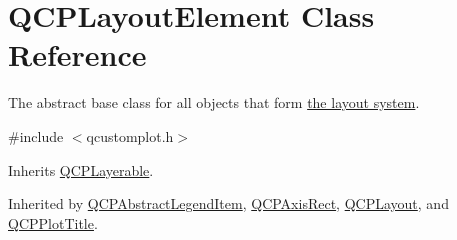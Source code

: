 \hypertarget{class_q_c_p_layout_element}{\section{Q\-C\-P\-Layout\-Element Class Reference}
\label{class_q_c_p_layout_element}
}


The abstract base class for all objects that form \hyperlink{thelayoutsystem}{the layout system}.  




{\ttfamily \#include $<$qcustomplot.\-h$>$}



Inherits \hyperlink{class_q_c_p_layerable}{Q\-C\-P\-Layerable}.



Inherited by \hyperlink{class_q_c_p_abstract_legend_item}{Q\-C\-P\-Abstract\-Legend\-Item}, \hyperlink{class_q_c_p_axis_rect}{Q\-C\-P\-Axis\-Rect}, \hyperlink{class_q_c_p_layout}{Q\-C\-P\-Layout}, and \hyperlink{class_q_c_p_plot_title}{Q\-C\-P\-Plot\-Title}.

